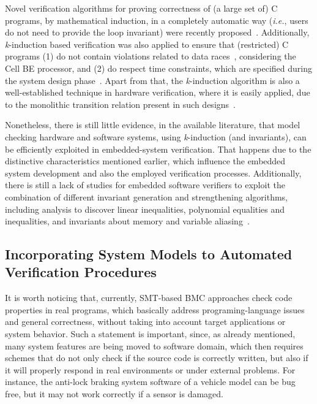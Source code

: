 \documentclass{acm_sen_article}
\begin{document}
Novel verification algorithms for proving correctness of (a large set of) C programs, by mathematical induction, in a completely automatic way ({\it i.e.}, users do not need to provide the loop invariant) were recently proposed~\cite{Gadelha15,Beyer15,Brain15,Rocha15,Kinductor,Rocha17}. Additionally, \textit{k}-induction based verification was also applied to ensure that (restricted) C programs (1) do not contain violations related to data races~\cite{Donaldson10}, considering the Cell BE processor, and (2) do respect time constraints, which are specified during the system design phase~\cite{EenS03}. Apart from that, the \textit{k}-induction algorithm is also a well-established technique in hardware verification, where it is easily applied, due to the monolithic transition relation present in such designs~\cite{EenS03,Sheera00,GrosseLD09}. 

Nonetheless, there is still little evidence, in the available literature, that model checking hardware and software systems, using \textit{k}-induction (and invariants), can be efficiently exploited in embedded-system verification. That happens due to the distinctive characteristics mentioned earlier, which influence the embedded system development and also the employed verification processes. Additionally, there is still a lack of studies for embedded software verifiers to exploit the combination of different invariant generation and strengthening algorithms, including analysis to discover linear inequalities, polynomial equalities and inequalities, and invariants about memory and variable aliasing~\cite{Bradley07}.

\subsection{Incorporating System Models to Automated Verification Procedures}

It is worth noticing that, currently, SMT-based BMC approaches check code properties in real programs, which basically address programing-language issues and general correctness, without taking into account target applications or system behavior. Such a statement is important, since, as already mentioned, many system features are being moved to software domain, which then requires schemes that do not only check if the source code is correctly written, but also if it will properly respond in real environments or under external problems. For instance, the anti-lock braking system software of a vehicle model can be bug free, but it may not work correctly if a sensor is damaged.
\end{document}
